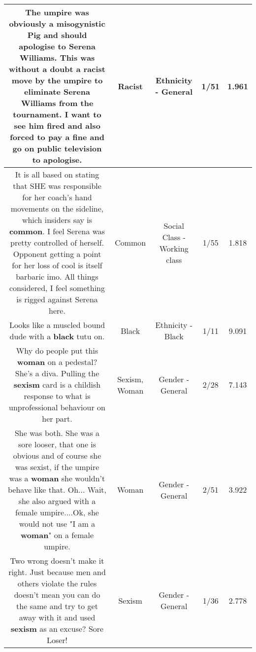 \documentclass[11pt]{article}
\newlength\mylength
\begin{document}
\begin{center}
\begin{longtable}{|C{.65\mylength}|C{.30\mylength}|C{.12\mylength}|C{.12\mylength}|C{.12\mylength}|}
  \small The umpire was obviously a misogynistic Pig and should apologise to Serena Williams. This was without a doubt a \textbf{racist} move by the umpire to eliminate Serena Williams from the tournament. I want to see him fired and also forced to pay a fine and go on public television to apologise.\normalsize   & Racist & Ethnicity - General & 1/51 & 1.961 \\  \hline
  \small It is all based on stating that SHE was responsible for her coach's hand movements on the sideline, which insiders say is \textbf{common}. I feel Serena was pretty controlled of herself. Opponent getting a point for her loss of cool is itself barbaric imo. All things considered, I feel something is rigged against Serena here.\normalsize   & Common & Social Class - Working class & 1/55 & 1.818 \\  \hline
  \small Looks like a muscled bound dude with a \textbf{black} tutu on.\normalsize   & Black & Ethnicity - Black & 1/11 & 9.091 \\  \hline
  \small Why do people put this \textbf{woman} on a pedestal? She's a diva. Pulling the \textbf{sexism} card is a childish response to what is  unprofessional behaviour on her part.\normalsize   & Sexism, Woman & Gender - General & 2/28 & 7.143 \\  \hline
  \small She was both. She was a sore looser,  that one is obvious and of course she was sexist, if the umpire was a \textbf{woman} she wouldn't behave like that. Oh... Wait, she also argued with a female umpire....Ok, she would not use "I am a \textbf{woman}"  on a female umpire.\normalsize   & Woman & Gender - General & 2/51 & 3.922 \\  \hline
  \small Two wrong doesn't make it right. Just because men and others violate the rules doesn't mean you can do the same and try to get away with it and used \textbf{sexism} as an excuse? Sore Loser!\normalsize   & Sexism & Gender - General & 1/36 & 2.778 \\  \hline

\end{longtable}
\end{center}
\end{document}
